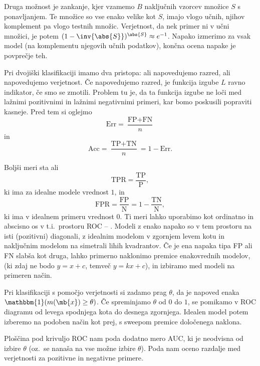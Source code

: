 
Druga možnost je zankanje, kjer vzamemo $B$ naključnih vzorcev množice $S$ s
ponavljanjem.
Te množice so vse enako velike kot $S$, imajo vlogo učnih, njihov komplement pa
vlogo testnih množic.
Verjetnost, da nek primer ni v učni množici, je potem $(1 -
\inv{\abs{S}})^{\abs{S}} \approx e^{-1}$.
Napako izmerimo za vsak model (na komplementu njegovih učnih podatkov), končna
ocena napake je povprečje teh.


Pri dvojiški klasifikaciji imamo dva pristopa: ali napovedujemo razred, ali
napovedujemo verjetnost.
Če napovedujemo razred, je funkcija izgube $L$ ravno indikator, če smo se
zmotili.
Problem tu je, da ta funkcija izgube ne loči med lažnimi pozitivnimi in lažnimi
negativnimi primeri, kar bomo poskusili popraviti kasneje.
Pred tem si oglejmo 
\[
  \text{Err} = \frac{\text{FP} + \text{FN}}{n}
\]
in 
\[
  \text{Acc} = \frac{\text{TP} + \text{TN}}{n} = 1 - \text{Err}.
\]


Boljši meri sta  ali
\[
  \text{TPR} = \frac{\text{TP}}{\text{P}},
\]
ki ima za idealne modele vrednost $1$, in 
\[
  \text{FPR} = \frac{\text{FP}}{\text{N}} = 1 - \frac{\text{TN}}{\text{N}},
\]
ki ima v idealnem primeru vrednost $0$.
Ti meri lahko uporabimo kot ordinatno in abscisno os v t.i.~prostoru ROC --
.
Modeli z enako napako so v tem prostoru na isti (pozitivni) diagonali, z
idealnim modelom v zgornjem levem kotu in naključnim modelom na simetrali lihih
kvadrantov.
Če je ena napaka tipa FP ali FN slabša kot druga, lahko primerno naklonimo
premice enakovrednih modelov, (ki zdaj ne bodo $y = x + c$, temveč $y = kx +
c$), in izbiramo med modeli na primeren način.


Pri klasifikaciji s pomočjo verjetnosti si zadamo prag $\theta$, da je napoved
enaka $\mathbbm{1}(m(\mb{x}) \ge \theta)$.
Če spreminjamo $\theta$ od $0$ do $1$, se pomikamo v ROC diagramu od levega
spodnjega kota do desnega zgornjega.
Idealen model potem izberemo na podoben način kot prej, s sweepom premice
določenega naklona.

Ploščina pod krivuljo ROC nam poda dodatno mero AUC, ki je neodvisna od izbire
$\theta$ (oz.~se nanaša na vse možne izbire $\theta$).
Poda nam oceno razdalje med verjetnosti za pozitivne in negativne primere.


